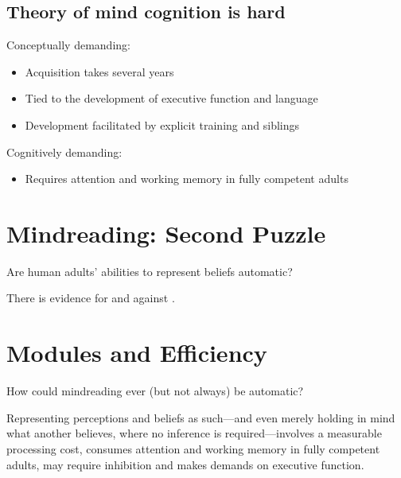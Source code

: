 \documentclass[12pt]{extarticle}
\begin{document}
\begin{multicols}{3}
\subsection{Theory of mind cognition is hard}
 
Conceptually demanding:
 
\begin{itemize}\itemsep0pt
 
\item Acquisition takes several years \citep{Wimmer:1983dz,Wellman:2001lz}
 
\item Tied to the development of executive function \citep{Perner:1999yr,Sabbagh:2006ke} and language \citep{Astington2005ot}
 
\item Development facilitated by explicit training \citep{Slaughter:1996fv} and siblings \citep{Clements:2000nc,Hughes:2004zj}
 
\end{itemize}
 
Cognitively demanding:
 
\begin{itemize}
 
\item Requires attention and working memory in fully competent adults \citep{Apperly:2008jv,McKinnon:2007rr}
 
\end{itemize}
 
 
 
\section{Mindreading: Second Puzzle}
 
Are human adults’ abilities to represent beliefs automatic?
 
There is evidence for \citep{kovacs_social_2010,Schneider:2011fk} and against \citep{apperly:2008_back,apperly_why_2010}.
 
 
 
\section{Modules and Efficiency}
 
How could mindreading ever (but not always) be automatic?
 
Representing perceptions and beliefs as such---and even merely holding in mind what another believes, where no inference is required---involves a measurable processing cost\citep{apperly:2008_back,apperly:2010_limits}, consumes attention and working memory in fully competent adults,\citealp{Apperly:2009cc, lin:2010_reflexively, McKinnon:2007rr} may require inhibition\citep{bull:2008_role} and makes demands on executive function.\citep{apperly:2004_frontal,samson:2005_seeing}
 

\end{multicols}
\end{document}
